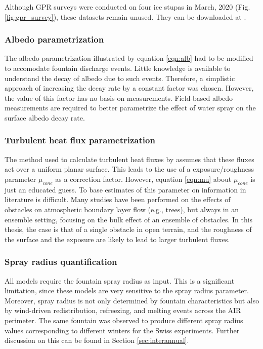 Although \ac{GPR} surveys were conducted on four ice stupas in March, 2020 (Fig. \ref{fig:gpr_survey}),
these datasets remain unused. They can be downloaded at \citet{balasubramanian_suryanarayanan_2022_7056646}.

\subsubsection{Albedo parametrization}

The albedo parametrization illustrated by equation \ref{eqn:alb} had to be modified to accomodate fountain
discharge events. Little knowledge is available to understand the decay of albedo due to such events. Therefore,
a simplistic approach of increasing the decay rate by a constant factor was chosen. However, the value of this
factor has no basis on measurements. Field-based albedo measurements are required to better
parametrize the effect of water spray on the surface albedo decay rate.

\subsubsection{Turbulent heat flux parametrization}

The method used to calculate turbulent heat fluxes by \citet{garrattAtmosphericBoundaryLayer1992} assumes that
these fluxes act over a uniform planar surface. This leads to the use of a exposure/roughness parameter
$\mu_{cone}$ as a correction factor. However, equation \ref{eqn:mu} about $\mu_{cone}$ is just an
educated guess. To base estimates of this parameter on information in literature is difficult. Many studies
have been performed on the effects of obstacles on atmospheric boundary layer flow (e.g., trees), but always in
an ensemble setting, focusing on the bulk effect of an ensemble of obstacles. In this thesis, the case is that of a single
obstacle in open terrain, and the roughness of the surface and the exposure are likely to lead to
larger turbulent fluxes.

\subsubsection{Spray radius quantification}

All models require the fountain spray radius as input. This is a significant limitation, since
these models are very sensitive to the spray radius parameter. Moreover, spray radius is not only determined by
fountain characteristics but also by wind-driven redistribution, refreezing, and melting events across
the AIR perimeter. The same fountain was observed to produce different spray radius values corresponding to different
winters for the Swiss experiments. Further discussion on this can be found in Section \ref{sec:interannual}.

